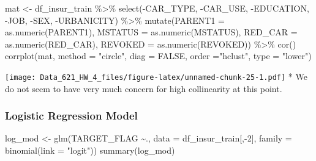 \documentclass[
]{article}
\newenvironment{Shaded}{\begin{snugshade}}{\end{snugshade}}
\newcommand{\AttributeTok}[1]{\textcolor[rgb]{0.77,0.63,0.00}{#1}}
\newcommand{\ConstantTok}[1]{\textcolor[rgb]{0.00,0.00,0.00}{#1}}
\newcommand{\DecValTok}[1]{\textcolor[rgb]{0.00,0.00,0.81}{#1}}
\newcommand{\FunctionTok}[1]{\textcolor[rgb]{0.00,0.00,0.00}{#1}}
\newcommand{\NormalTok}[1]{#1}
\newcommand{\OtherTok}[1]{\textcolor[rgb]{0.56,0.35,0.01}{#1}}
\newcommand{\SpecialCharTok}[1]{\textcolor[rgb]{0.00,0.00,0.00}{#1}}
\newcommand{\StringTok}[1]{\textcolor[rgb]{0.31,0.60,0.02}{#1}}
\begin{document}
\begin{Shaded}
\begin{Highlighting}[]
\NormalTok{mat }\OtherTok{\textless{}{-}}\NormalTok{ df\_insur\_train }\SpecialCharTok{\%\textgreater{}\%} 
  \FunctionTok{select}\NormalTok{(}\SpecialCharTok{{-}}\NormalTok{CAR\_TYPE, }\SpecialCharTok{{-}}\NormalTok{CAR\_USE, }\SpecialCharTok{{-}}\NormalTok{EDUCATION, }\SpecialCharTok{{-}}\NormalTok{JOB, }\SpecialCharTok{{-}}\NormalTok{SEX, }\SpecialCharTok{{-}}\NormalTok{URBANICITY) }\SpecialCharTok{\%\textgreater{}\%} 
  \FunctionTok{mutate}\NormalTok{(}\AttributeTok{PARENT1 =} \FunctionTok{as.numeric}\NormalTok{(PARENT1), }\AttributeTok{MSTATUS =} \FunctionTok{as.numeric}\NormalTok{(MSTATUS),}
         \AttributeTok{RED\_CAR =} \FunctionTok{as.numeric}\NormalTok{(RED\_CAR), }\AttributeTok{REVOKED =} \FunctionTok{as.numeric}\NormalTok{(REVOKED)) }\SpecialCharTok{\%\textgreater{}\%} 
  \FunctionTok{cor}\NormalTok{()}
\FunctionTok{corrplot}\NormalTok{(mat, }\AttributeTok{method =} \StringTok{"circle"}\NormalTok{, }\AttributeTok{diag =} \ConstantTok{FALSE}\NormalTok{, }\AttributeTok{order =}\StringTok{"hclust"}\NormalTok{, }\AttributeTok{type =} \StringTok{"lower"}\NormalTok{)}
\end{Highlighting}
\end{Shaded}

\texttt{[image: Data\_621\_HW\_4\_files/figure-latex/unnamed-chunk-25-1.pdf]}
* We do not seem to have very much concern for high collinearity at this
point.

\hypertarget{logistic-regression-model}{%
\subsubsection{Logistic Regression
Model}\label{logistic-regression-model}}

\begin{Shaded}
\begin{Highlighting}[]
\NormalTok{log\_mod }\OtherTok{\textless{}{-}} \FunctionTok{glm}\NormalTok{(TARGET\_FLAG }\SpecialCharTok{\textasciitilde{}}\NormalTok{., }\AttributeTok{data =}\NormalTok{ df\_insur\_train[,}\SpecialCharTok{{-}}\DecValTok{2}\NormalTok{],}
               \AttributeTok{family =} \FunctionTok{binomial}\NormalTok{(}\AttributeTok{link =} \StringTok{"logit"}\NormalTok{))}
\FunctionTok{summary}\NormalTok{(log\_mod)}
\end{Highlighting}
\end{Shaded}
\end{document}
